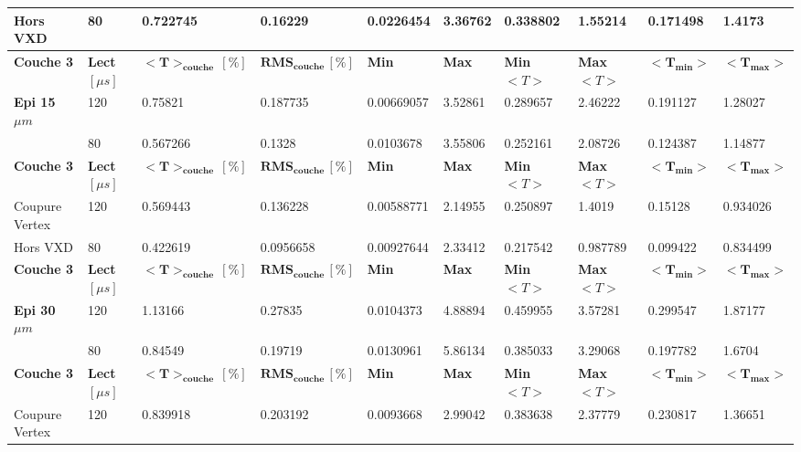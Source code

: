 \begin{table}
\begin{tabular}{|l|l|l|l|l|l|l|l|l|l|}
Hors VXD                & 80      & 0.722745           & 0.16229           & 0.0226454  & 3.36762 & 0.338802 & 1.55214  & 0.171498  & 1.4173    \\ \hline
\textbf{Couche 3} & \textbf{Lect} $[\mu s]$ & $\mathbf{<T>_{couche} \, [\%]}$ & $\mathbf{RMS_{couche} \, [\%]}$ & \textbf{Min} & \textbf{Max} & \textbf{Min} $<T>$ & \textbf{Max} $<T>$ & $\mathbf{<T_{min}>}$ & $\mathbf{<T_{max}>}$ \\ \hline
   \textbf{Epi 15} $\mu m$                     & 120     & 0.75821            & 0.187735          & 0.00669057 & 3.52861 & 0.289657 & 2.46222  & 0.191127  & 1.28027   \\ \hline
                        & 80      & 0.567266           & 0.1328            & 0.0103678  & 3.55806 & 0.252161 & 2.08726  & 0.124387  & 1.14877   \\ \hline
\textbf{Couche 3} & \textbf{Lect} $[\mu s]$ & $\mathbf{<T>_{couche} \, [\%]}$ & $\mathbf{RMS_{couche} \, [\%]}$ & \textbf{Min} & \textbf{Max} & \textbf{Min} $<T>$ & \textbf{Max} $<T>$ & $\mathbf{<T_{min}>}$ & $\mathbf{<T_{max}>}$ \\ \hline
Coupure Vertex          & 120     & 0.569443           & 0.136228          & 0.00588771 & 2.14955 & 0.250897 & 1.4019   & 0.15128   & 0.934026  \\ \hline
Hors VXD                & 80      & 0.422619           & 0.0956658         & 0.00927644 & 2.33412 & 0.217542 & 0.987789 & 0.099422  & 0.834499  \\ \hline
\textbf{Couche 3} & \textbf{Lect} $[\mu s]$ & $\mathbf{<T>_{couche} \, [\%]}$ & $\mathbf{RMS_{couche} \, [\%]}$ & \textbf{Min} & \textbf{Max} & \textbf{Min} $<T>$ & \textbf{Max} $<T>$ & $\mathbf{<T_{min}>}$ & $\mathbf{<T_{max}>}$ \\ \hline
    \textbf{Epi 30} $\mu m$                    & 120     & 1.13166            & 0.27835           & 0.0104373  & 4.88894 & 0.459955 & 3.57281  & 0.299547  & 1.87177   \\ \hline
                        & 80      & 0.84549            & 0.19719           & 0.0130961  & 5.86134 & 0.385033 & 3.29068  & 0.197782  & 1.6704    \\ \hline
\textbf{Couche 3} & \textbf{Lect} $[\mu s]$ & $\mathbf{<T>_{couche} \, [\%]}$ & $\mathbf{RMS_{couche} \, [\%]}$ & \textbf{Min} & \textbf{Max} & \textbf{Min} $<T>$ & \textbf{Max} $<T>$ & $\mathbf{<T_{min}>}$ & $\mathbf{<T_{max}>}$ \\ \hline
Coupure Vertex          & 120     & 0.839918           & 0.203192          & 0.0093668  & 2.99042 & 0.383638 & 2.37779  & 0.230817  & 1.36651   \\ \hline

\end{tabular}
\end{table}
